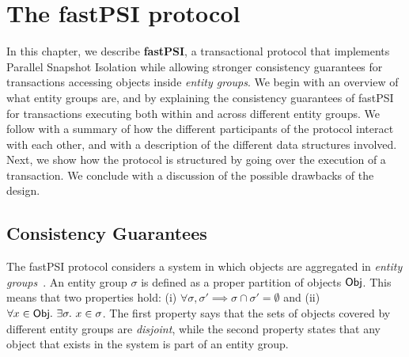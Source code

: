 \cleardoublepage
\chapter{The fastPSI protocol}
\label{chapter:protocol}





In this chapter, we describe \textbf{fastPSI}, a transactional protocol that implements Parallel Snapshot Isolation while allowing stronger consistency guarantees for transactions accessing objects inside \emph{entity groups}. We begin with an overview of what entity groups are, and by explaining the consistency guarantees of fastPSI for transactions executing both within and across different entity groups. We follow with a summary of how the different participants of the protocol interact with each other, and with a description of the different data structures involved. Next, we show how the protocol is structured by going over the execution of a transaction. We conclude with a discussion of the possible drawbacks of the design.

\section{Consistency Guarantees}

The fastPSI protocol considers a system in which objects are aggregated in \emph{entity groups}~\citep{baker_megastore}. An entity group $\sigma$ is defined as a proper partition of objects ${\sf Obj}$. This means that two properties hold: (i) $\forall \sigma, \sigma' \implies \sigma \cap \sigma' = \emptyset$ and (ii) $\forall x \in {\sf Obj} .\ \exists \sigma .\ x \in \sigma$. The first property says that the sets of objects covered by different entity groups are \emph{disjoint}, while the second property states that any object that exists in the system is part of an entity group.

